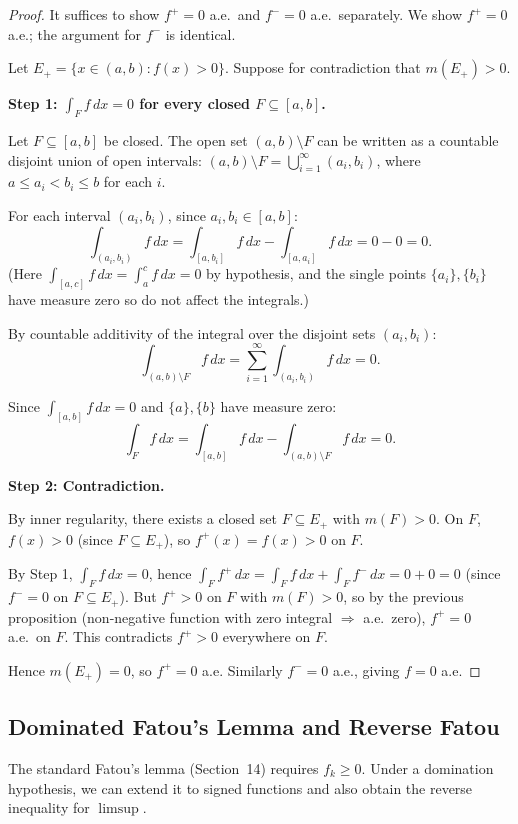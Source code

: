 \documentclass[11pt]{report}
\begin{document}
\begin{proof}
It suffices to show $f^+ = 0$ a.e.\ and $f^- = 0$ a.e.\ separately. We show $f^+ = 0$ a.e.; the argument for $f^-$ is identical.

Let $E_+ = \{x \in (a,b) : f(x) > 0\}$. Suppose for contradiction that $m(E_+) > 0$.

\textbf{Step 1: $\int_F f\,dx = 0$ for every closed $F \subseteq [a,b]$.}

Let $F \subseteq [a,b]$ be closed. The open set $(a,b) \setminus F$ can be written as a countable disjoint union of open intervals: $(a,b) \setminus F = \bigcup_{i=1}^{\infty} (a_i, b_i)$, where $a \leq a_i < b_i \leq b$ for each $i$.

For each interval $(a_i, b_i)$, since $a_i, b_i \in [a,b]$:
\[
\int_{(a_i, b_i)} f\,dx = \int_{[a, b_i]} f\,dx - \int_{[a, a_i]} f\,dx = 0 - 0 = 0.
\]
(Here $\int_{[a, c]} f\,dx = \int_a^c f\,dx = 0$ by hypothesis, and the single points $\{a_i\}, \{b_i\}$ have measure zero so do not affect the integrals.)

By countable additivity of the integral over the disjoint sets $(a_i, b_i)$:
\[
\int_{(a,b) \setminus F} f\,dx = \sum_{i=1}^{\infty} \int_{(a_i, b_i)} f\,dx = 0.
\]

Since $\int_{[a,b]} f\,dx = 0$ and $\{a\}, \{b\}$ have measure zero:
\[
\int_F f\,dx = \int_{[a,b]} f\,dx - \int_{(a,b) \setminus F} f\,dx = 0.
\]

\textbf{Step 2: Contradiction.}

By inner regularity, there exists a closed set $F \subseteq E_+$ with $m(F) > 0$. On $F$, $f(x) > 0$ (since $F \subseteq E_+$), so $f^+(x) = f(x) > 0$ on $F$.

By Step 1, $\int_F f\,dx = 0$, hence $\int_F f^+\,dx = \int_F f\,dx + \int_F f^-\,dx = 0 + 0 = 0$ (since $f^- = 0$ on $F \subseteq E_+$). But $f^+ > 0$ on $F$ with $m(F) > 0$, so by the previous proposition (non-negative function with zero integral $\Rightarrow$ a.e.\ zero), $f^+ = 0$ a.e.\ on $F$. This contradicts $f^+ > 0$ everywhere on $F$.

Hence $m(E_+) = 0$, so $f^+ = 0$ a.e. Similarly $f^- = 0$ a.e., giving $f = 0$ a.e.
\end{proof}

\subsection{Dominated Fatou's Lemma and Reverse Fatou}

The standard Fatou's lemma (Section~14) requires $f_k \geq 0$. Under a domination hypothesis, we can extend it to signed functions and also obtain the reverse inequality for $\limsup$.
\end{document}
